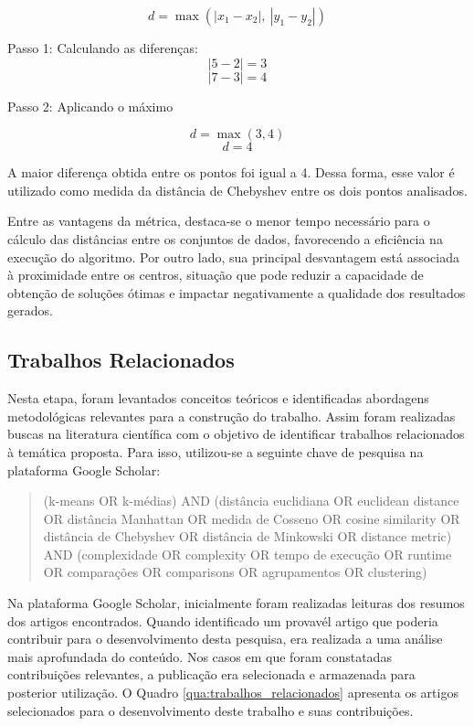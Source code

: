 \documentclass[10pt,a4paper,twocolumn]{article}
\begin{document}
\[
d = \max \left( |x_1 - x_2|,\ |y_1 - y_2| \right)
\]

Passo 1: Calculando as diferenças:
\[
|5 - 2| = 3
\]
\[
|7 - 3| = 4
\] 

Passo 2: Aplicando o máximo

\[
d = \max(3,4)
\]
\[
d = 4
\]

A maior diferença obtida entre os pontos foi igual a 4. Dessa forma, esse valor é utilizado como medida da distância de Chebyshev entre os dois pontos analisados.


Entre as vantagens da métrica, destaca-se o menor tempo necessário para o cálculo das distâncias entre os conjuntos de dados, favorecendo a eficiência na execução do algoritmo. Por outro lado, sua principal desvantagem está associada à proximidade entre os centros, situação que pode reduzir a capacidade de obtenção de soluções ótimas e impactar negativamente a qualidade dos resultados gerados\cite{VelezFalconi2020}.




\subsection{Trabalhos Relacionados} %
\label{sec:trabrelacionado}
Nesta etapa, foram levantados conceitos teóricos e identificadas abordagens metodológicas relevantes para a construção do trabalho. Assim foram realizadas buscas na literatura científica com o objetivo de identificar trabalhos relacionados à temática proposta. Para isso, utilizou-se a seguinte chave de pesquisa na plataforma Google Scholar:
\begin{quote}
(k-means OR k-médias)
AND
(distância euclidiana OR euclidean distance
OR distância Manhattan
OR medida de Cosseno
OR cosine similarity
OR distância de Chebyshev
OR distância de Minkowski
OR distance metric)
AND
(complexidade OR complexity
OR tempo de execução
OR runtime
OR comparações
OR comparisons
OR agrupamentos
OR clustering)
\end{quote}

Na plataforma Google Scholar, inicialmente foram realizadas leituras dos resumos dos artigos encontrados. Quando identificado um provavél artigo que poderia contribuir para o desenvolvimento desta pesquisa, era realizada a uma análise mais aprofundada do conteúdo. Nos casos em que foram constatadas contribuições relevantes, a publicação era selecionada e armazenada para posterior utilização. O Quadro  \ref{qua:trabalhos_relacionados} apresenta os artigos selecionados para o desenvolvimento deste trabalho e suas contribuições.
\end{document}
